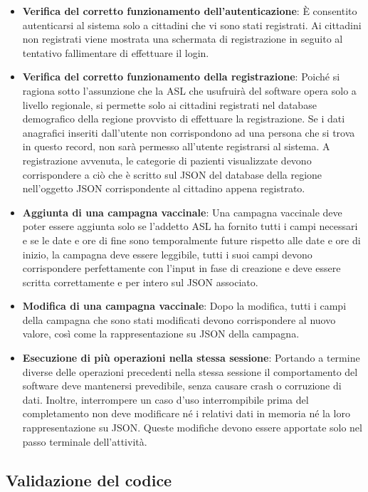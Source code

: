 \documentclass{article}
\begin{document}
\begin{itemize}
    \item \textbf{Verifica del corretto funzionamento dell'autenticazione}: È consentito autenticarsi al sistema solo a cittadini che vi sono stati registrati. Ai cittadini non registrati viene mostrata una schermata di registrazione in seguito al tentativo fallimentare di effettuare il login.
    \item \textbf{Verifica del corretto funzionamento della registrazione}: Poiché si ragiona sotto l'assunzione che la ASL che usufruirà del software opera solo a livello regionale, si permette solo ai cittadini registrati nel database demografico della regione provvisto di effettuare la registrazione. Se i dati anagrafici inseriti dall'utente non corrispondono ad una persona che si trova in questo record, non sarà permesso all'utente registrarsi al sistema. A registrazione avvenuta, le categorie di pazienti visualizzate devono corrispondere a ciò che è scritto sul JSON del database della regione nell'oggetto JSON corrispondente al cittadino appena registrato.
    \item \textbf{Aggiunta di una campagna vaccinale}: Una campagna vaccinale deve poter essere aggiunta solo se l'addetto ASL ha fornito tutti i campi necessari e se le date e ore di fine sono temporalmente future rispetto alle date e ore di inizio, la campagna deve essere leggibile, tutti i suoi campi devono corrispondere perfettamente con l'input in fase di creazione e deve essere scritta correttamente e per intero sul JSON associato.
    \item \textbf{Modifica di una campagna vaccinale}: Dopo la modifica, tutti i campi della campagna che sono stati modificati devono corrispondere al nuovo valore, così come la rappresentazione su JSON della campagna.
    \item \textbf{Esecuzione di più operazioni nella stessa sessione}: Portando a termine diverse delle operazioni precedenti nella stessa sessione il comportamento del software deve mantenersi prevedibile, senza causare crash o corruzione di dati. Inoltre, interrompere un caso d'uso interrompibile prima del completamento non deve modificare né i relativi dati in memoria né la loro rappresentazione su JSON. Queste modifiche devono essere apportate solo nel passo terminale dell'attività.
\end{itemize}

\subsection{Validazione del codice}
\end{document}
